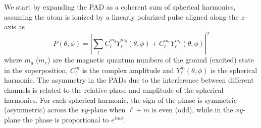 We start by expanding the PAD as a coherent sum of spherical harmonics, assuming 
the atom is ionized by a linearly polarized pulse aligned along the $z$-axis as
\begin{equation}
    P(\theta,\phi) = \left|\sum_\ell C_{\ell}^{m_g} Y_\ell^{m_g}(\theta,\phi)+C_{\ell}^{m_e} Y_\ell^{m_e}(\theta,\phi)\right|^2
\end{equation}
where $m_g$ ($m_e$) are the magnetic quantum numbers of the ground (excited) state in the superposition, $C_\ell^m$ is the complex amplitude and $Y_\ell^m(\theta,\phi)$ is the spherical harmonic. The asymmetry in the PADs due to the interference between different channels is related to the relative phase and amplitude of the spherical harmonics. For each spherical harmonic, the sign of the phase is symmetric (asymmetric) across the $xy$-plane when $\ell+m$ is even (odd), while
in the $xy$-plane 
the phase is proportional to $e^{im\phi}$. 

